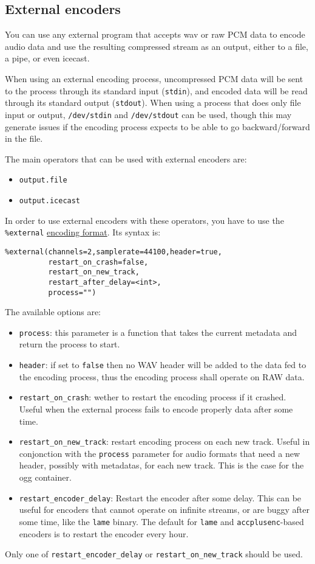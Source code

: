 \subsection{External encoders}
You can use any external program that accepts wav or raw PCM data to encode
audio data and use the resulting compressed stream as an output, either to a
file, a pipe, or even icecast.

When using an external encoding process, uncompressed PCM data will be sent to
the process through its standard input (\verb+stdin+), and encoded data will be
read through its standard output (\verb+stdout+). When using a process that does
only file input or output, \verb+/dev/stdin+ and \verb+/dev/stdout+ can be used,
though this may generate issues if the encoding process expects to be able to go
backward/forward in the file.

The main operators that can be used with external encoders are:
\begin{itemize}
\item \verb+output.file+
\item \verb+output.icecast+
\end{itemize}
In order to use external encoders with these operators, you have to use the
\verb+%external+ \href{encoding_formats.html}{encoding format}.
Its syntax is:

\begin{verbatim}
%external(channels=2,samplerate=44100,header=true,
          restart_on_crash=false,
          restart_on_new_track,
          restart_after_delay=<int>,
          process="")
\end{verbatim}
The available options are:

\begin{itemize}
\item \verb+process+: this parameter is a function that takes the current metadata and return the process to start.
\item \verb+header+: if set to \verb+false+ then no WAV header will be added to the data fed to the encoding process, thus the encoding process shall operate on RAW data.
\item \verb+restart_on_crash+: wether to restart the encoding process if it crashed. Useful when the external process fails to encode properly data after some time.
\item \verb+restart_on_new_track+: restart encoding process on each new track. Useful in conjonction with the \verb+process+ parameter for audio formats that need a new header, possibly with metadatas, for each new track. This is the case for the ogg container.
\item \verb+restart_encoder_delay+: Restart the encoder after some delay. This can be useful for encoders that cannot operate on infinite streams, or are buggy after some time, like the \verb+lame+ binary. The default for \verb+lame+ and \verb+accplusenc+-based encoders is to restart the encoder every hour.

\end{itemize}
Only one of \verb+restart_encoder_delay+ or \verb+restart_on_new_track+ should be used.


